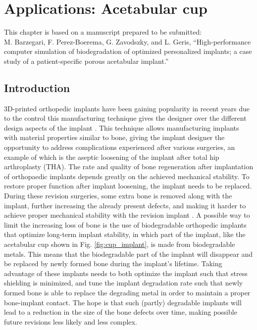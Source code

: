 \chapter{Applications: Acetabular cup}\label{ch:cup}

\begin{shaded}
This chapter is based on a manuscript prepared to be submitted:\\
M. Barzegari, F. Perez-Boerema, G. Zavodszky, and L. Geris, ``High-performance computer simulation of biodegradation of optimized personalized implants; a case study of a patient-specific porous acetabular implant.''
\end{shaded}

\section{Introduction}


3D-printed orthopedic implants have been gaining  popularity in recent years due to the control this manufacturing technique gives the designer over the different design aspects of the implant \cite{Kumar2021,Yadav2020}. This technique allows manufacturing implants with material properties similar to bone, giving the implant designer the opportunity to address complications experienced after various surgeries, an example of which is the aseptic loosening of the implant after total hip arthroplasty (THA). The rate and quality of bone regeneration after implantation of orthopaedic implants depends greatly on the achieved mechanical stability. To restore proper function after implant loosening, the implant needs to be replaced. During these revision surgeries, some extra bone is removed along with the implant, further increasing the already present defects, and making it harder to achieve proper mechanical stability with the revision implant \cite{Luthringer2014}. A possible way to limit the increasing loss of bone is the use of biodegradable orthopedic implants that optimize long-term implant stability, in which part of the implant, like the acetabular cup shown in Fig. \ref{fig:cup_implant}, is made from biodegradable metals. This means that the biodegradable part of the implant will disappear and be replaced by newly formed bone during the implant's lifetime. Taking advantage of these implants needs to both optimize the implant such that stress shielding is minimized, and tune the implant degradation rate such that newly formed bone is able to replace the degrading metal in order to maintain a proper bone-implant contact. The hope is that such (partly) degradable implants will lead to a reduction in the size of the bone defects over time, making possible future revisions less likely and less complex.

